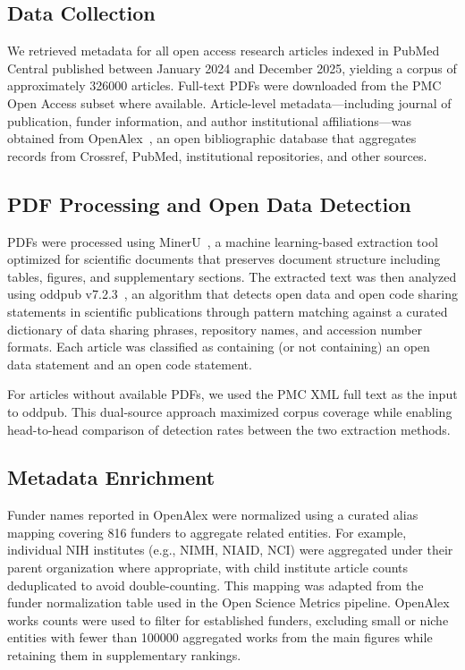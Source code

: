 \subsection{Data Collection}

We retrieved metadata for all open access research articles indexed in PubMed Central published between January 2024 and December 2025, yielding a corpus of approximately \num{326000} articles. Full-text PDFs were downloaded from the PMC Open Access subset where available. Article-level metadata---including journal of publication, funder information, and author institutional affiliations---was obtained from OpenAlex~\cite{Priem2022-wr}, an open bibliographic database that aggregates records from Crossref, PubMed, institutional repositories, and other sources.

\subsection{PDF Processing and Open Data Detection}

PDFs were processed using MinerU~\cite{Wang2024mineru}, a machine learning-based extraction tool optimized for scientific documents that preserves document structure including tables, figures, and supplementary sections. The extracted text was then analyzed using oddpub v7.2.3~\cite{Riedel2020-fk}, an algorithm that detects open data and open code sharing statements in scientific publications through pattern matching against a curated dictionary of data sharing phrases, repository names, and accession number formats. Each article was classified as containing (or not containing) an open data statement and an open code statement.

For articles without available PDFs, we used the PMC XML full text as the input to oddpub. This dual-source approach maximized corpus coverage while enabling head-to-head comparison of detection rates between the two extraction methods.

\subsection{Metadata Enrichment}

Funder names reported in OpenAlex were normalized using a curated alias mapping covering 816 funders to aggregate related entities. For example, individual NIH institutes (e.g., NIMH, NIAID, NCI) were aggregated under their parent organization where appropriate, with child institute article counts deduplicated to avoid double-counting. This mapping was adapted from the funder normalization table used in the Open Science Metrics pipeline. OpenAlex works counts were used to filter for established funders, excluding small or niche entities with fewer than \num{100000} aggregated works from the main figures while retaining them in supplementary rankings.

